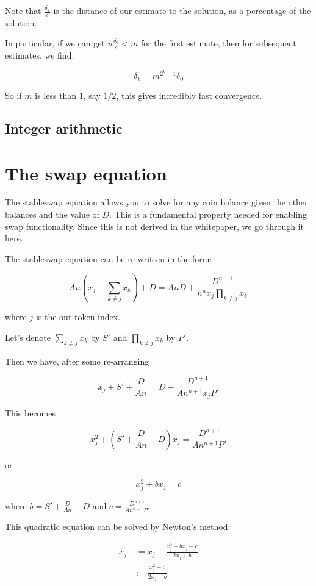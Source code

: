 \documentclass[
]{article}
\begin{document}
Note that \(\frac{\delta_k}{c}\) is the distance of our estimate to the
solution, as a percentage of the solution.

In particular, if we can get \(n\frac{\delta_0}{c} < m\) for the first
estimate, then for subsequent estimates, we find:

\[ \delta_{k} = m^{2^k - 1} \delta_0\]

So if \(m\) is less than 1, say \(1/2\), this gives incredibly fast
convergence.

\hypertarget{integer-arithmetic}{%
\subsection{Integer arithmetic}\label{integer-arithmetic}}

\hypertarget{the-swap-equation}{%
\section{The swap equation}\label{the-swap-equation}}

The stableswap equation allows you to solve for any coin balance given
the other balances and the value of \(D\). This is a fundamental
property needed for enabling swap functionality. Since this is not
derived in the whitepaper, we go through it here.

The stableswap equation can be re-written in the form:

\[ An\left(x_j + \sum_{k\neq j} x_k\right) + D = AnD + \frac{D^{n+1}}{n^n x_j \prod_{k\neq j} x_k} \]

where \(j\) is the out-token index.

Let's denote \(\sum_{k\neq j} x_k\) by \(S'\) and
\(\prod_{k\neq j} x_k\) by \(P'\).

Then we have, after some re-arranging

\[ x_j + S' + \frac{D}{An} = D + \frac{D^{n+1}}{An^{n+1} x_j P'} \]

This becomes

\[ x_j^2 + \left(S' + \frac{D}{An} - D\right) x_j = \frac{D^{n+1}}{An^{n+1}P'}\]

or

\[ x_j^2 + bx_j = c\]

where \(b = S' + \frac{D}{An} - D\) and
\(c = \frac{D^{n+1}}{An^{n+1}P'}\).

This quadratic equation can be solved by Newton's method:

\[ \begin{aligned}
x_j &:= x_j - \frac{x_j^2 + bx_j - c}{2x_j + b}\\
&:= \frac{x_j^2 + c}{2x_j + b} \\
\end{aligned} \]
\end{document}
